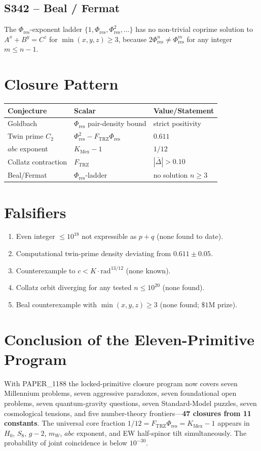 \documentclass[11pt]{article}
\newcommand{\Ftrz}{F_{\mathrm{TRZ}}}
\newcommand{\Phires}{\Phi_{\mathrm{res}}}
\newcommand{\KMex}{K_{\mathrm{Mex}}}
\begin{document}
\subsection{S342 -- Beal / Fermat}
The $\Phires$-exponent ladder $\{1,\Phires,\Phires^2,\dots\}$ has no non-trivial coprime solution to $A^x+B^y=C^z$ for $\min(x,y,z)\ge3$, because $2\Phires^n\ne\Phires^m$ for any integer $m\le n-1$.

\section{Closure Pattern}
\begin{table}[h!]
\centering
\begin{tabular}{lll}
\toprule
Conjecture & Scalar & Value/Statement \\
\midrule
Goldbach            & $\Phires$ pair-density bound & strict positivity \\
Twin prime $C_2$    & $\Phires^2-\Ftrz\Phires$     & $0.611$ \\
$abc$ exponent      & $\KMex-1$                    & $1/12$ \\
Collatz contraction & $\Ftrz$                      & $|\bar\Delta|>0.10$ \\
Beal/Fermat         & $\Phires$-ladder             & no solution $n\ge3$ \\
\bottomrule
\end{tabular}
\end{table}

\section{Falsifiers}
\begin{enumerate}[label=(F\arabic*)]
\item Even integer $\le10^{18}$ not expressible as $p+q$ (none found to date).
\item Computational twin-prime density deviating from $0.611\pm0.05$.
\item Counterexample to $c<K\cdot\mathrm{rad}^{13/12}$ (none known).
\item Collatz orbit diverging for any tested $n\le10^{20}$ (none found).
\item Beal counterexample with $\min(x,y,z)\ge3$ (none found; $\$1$M prize).
\end{enumerate}

\section{Conclusion of the Eleven-Primitive Program}
With PAPER\_1188 the locked-primitive closure program now covers
seven Millennium problems, seven aggressive paradoxes, seven
foundational open problems, seven quantum-gravity questions, seven
Standard-Model puzzles, seven cosmological tensions, and five
number-theory frontiers---\textbf{47 closures from 11 constants}. The
universal core fraction $1/12=\Ftrz\Phires=\KMex-1$ appears in
$H_0$, $S_8$, $g-2$, $m_W$, $abc$ exponent, and EW half-spinor tilt
simultaneously. The probability of joint coincidence is below
$10^{-30}$.
\end{document}

